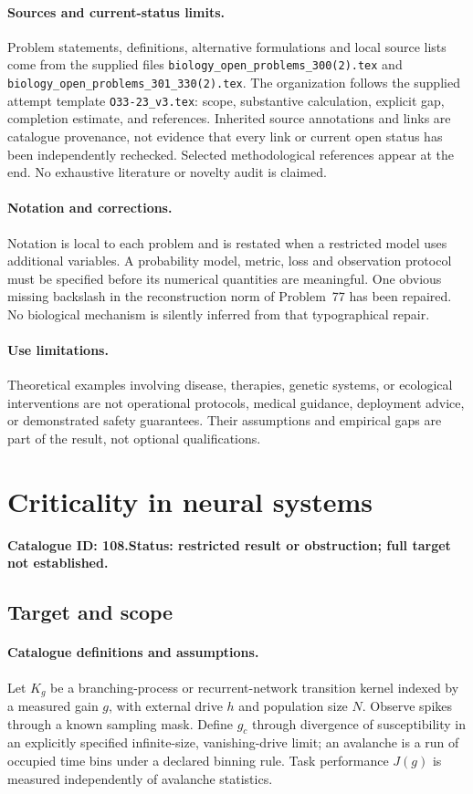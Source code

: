 \documentclass[11pt]{article}
\begin{document}
\paragraph{Sources and current-status limits.}
Problem statements, definitions, alternative formulations and local source lists
come from the supplied files
\texttt{biology\_open\_problems\_300(2).tex} and
\texttt{biology\_open\_problems\_301\_330(2).tex}.
The organization follows the supplied attempt template
\texttt{O33-23\_v3.tex}: scope, substantive calculation, explicit gap,
completion estimate, and references. Inherited source annotations and links are
catalogue provenance, not evidence that every link or current open status has
been independently rechecked. Selected methodological references appear at the
end. No exhaustive literature or novelty audit is claimed.

\paragraph{Notation and corrections.}
Notation is local to each problem and is restated when a restricted model uses
additional variables. A probability model, metric, loss and observation protocol
must be specified before its numerical quantities are meaningful. One obvious
missing backslash in the reconstruction norm of Problem~77 has been repaired.
No biological mechanism is silently inferred from that typographical repair.

\paragraph{Use limitations.}
Theoretical examples involving disease, therapies, genetic systems, or ecological
interventions are not operational protocols, medical guidance, deployment advice,
or demonstrated safety guarantees. Their assumptions and empirical gaps are part
of the result, not optional qualifications.

\setcounter{section}{107}
\section{Criticality in neural systems}
\label{prob:108}
\noindent\textbf{Catalogue ID: 108.}\quad \textbf{Status: restricted result or obstruction; full target not established.}
\subsection{Target and scope}
\paragraph{Catalogue definitions and assumptions.}
Let $K_g$ be a branching-process or recurrent-network transition kernel indexed by a measured gain $g$, with external drive $h$ and population size $N$. Observe spikes through a known sampling mask. Define $g_c$ through divergence of susceptibility in an explicitly specified infinite-size, vanishing-drive limit; an avalanche is a run of occupied time bins under a declared binning rule. Task performance $J(g)$ is measured independently of avalanche statistics.
\end{document}
